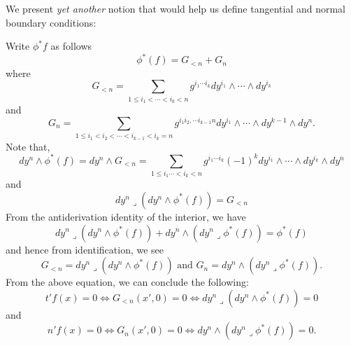 We present \emph{yet another} notion that would help us define tangential and normal boundary conditions:
\begin{remark}\label{rmk:G_n and so on}
    Write $\phi^*f$ as follows $$\phi^*(f)=G_{<n}+G_n $$ where \begin{equation}
        G_{<n}= \sum_{1\leq i_1<\cdots<i_k<n} g^{i_1\cdots i_k}dy^{i_1}\wedge \cdots \wedge dy^{i_k}
    \end{equation}
and \begin{equation}G_n=\sum_{1\leq i_1<i_2<\cdots<i_{k-1}<i_k=n} g^{i_1 i_2,\cdots i_{k-1} n} dy^{i_1}\wedge \cdots \wedge dy^{k-1}\wedge dy^n.\end{equation}
Note that, $$dy^n\wedge \phi^*(f)=dy^n \wedge G_{<n}=\sum_{1\leq i_1\cdots<i_k<n} g^{i_1\cdots i_k} (-1)^k dy^{i_1}\wedge \cdots \wedge dy^{i_k}\wedge dy^n $$
and $$dy^n \lrcorner (dy^n \wedge \phi^*(f))=G_{<n}$$
From the antiderivation identity of the interior, we have $$dy^n\lrcorner(dy^n \wedge \phi^*(f))+ dy^n \wedge (dy^n \lrcorner \phi^*(f))=\phi^*(f)$$
and hence from identification, we see \begin{equation}
    G_{<n}=dy^n \lrcorner (dy^n \wedge \phi^*(f)) \text{ and } G_n=dy^n\wedge(dy^n \lrcorner \phi^*(f)).
    \end{equation}
From the above equation, we can conclude the following: 
$$t'f(x)=0 \iff G_{<n}(x',0)=0 \iff dy^n \lrcorner (dy^n \wedge \phi^*(f))=0 $$
and $$n'f(x)=0 \iff G_{n}(x',0)=0 \iff dy^n \wedge (dy^n \lrcorner \phi^*(f))=0. $$
\end{remark}


